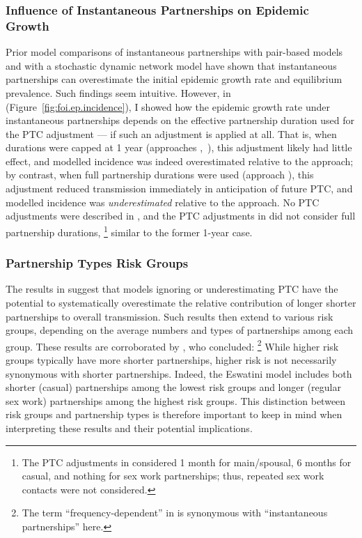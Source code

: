 \subsubsection{Influence of Instantaneous Partnerships on Epidemic Growth}
Prior model comparisons of instantaneous partnerships
with pair-based models \cite{Kretzschmar1998,Eames2002,Lloyd-Smith2004} and
with a stochastic dynamic network model \cite{Johnson2016mf}
have shown that instantaneous partnerships
can overestimate the initial epidemic growth rate and equilibrium prevalence.
Such findings seem intuitive.
However, in  (Figure~\ref{fig:foi.ep.incidence}),
I showed how the epidemic growth rate under instantaneous partnerships depends
on the effective partnership duration used for the PTC adjustment
--- if such an adjustment is applied at all.
That is, when durations were capped at 1 year (approaches \iry,~\ipy),
this adjustment likely had little effect,
and modelled incidence was indeed overestimated relative to the \epa approach;
by contrast, when full partnership durations were used (approach \ird),
this adjustment reduced transmission immediately in anticipation of future PTC,
and modelled incidence was \emph{underestimated} relative to the \epa approach.
No PTC adjustments were described in \cite{Eames2002,Lloyd-Smith2004}, and
the PTC adjustments in \cite{Johnson2016mf} did not consider full partnership durations,%
\footnote{The PTC adjustments in \cite{Johnson2016mf} considered
  1 month for main/spousal, 6 months for casual, and nothing for sex work partnerships;
  thus, repeated sex work contacts were not considered.}
similar to the former 1-year case.
\subsubsection{Partnership Types \vs Risk Groups}
The results in  suggest that models ignoring or underestimating PTC
have the potential to systematically overestimate
the relative contribution of longer \vs shorter partnerships to overall transmission.
Such results then extend to various risk groups,
depending on the average numbers and types of partnerships among each group.
These results are corroborated by \citet{Johnson2016mf}, who concluded:%
\footnote{The term ``frequency-dependent'' in \cite{Johnson2016mf} is synonymous with
  ``instantaneous partnerships'' here.}
While higher risk groups typically have more shorter partnerships,
higher risk is not necessarily synonymous with shorter partnerships.
Indeed, the Eswatini model includes both
shorter (casual) partnerships among the lowest risk groups and
longer (regular sex work) partnerships among the highest risk groups.
This distinction between risk groups and partnership types is therefore important to keep in mind
when interpreting these results and their potential implications.
